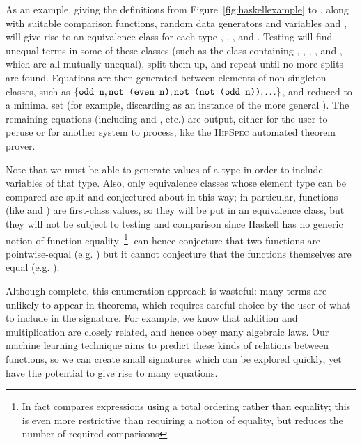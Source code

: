 As an example, giving the definitions from Figure~\ref{fig:haskellexample} to
\qspec{}, along with suitable comparison functions, random data generators and
variables  and , will give rise to an equivalence
class for each type , , ,  and
. Testing will find unequal terms in some of these classes
(such as the  class containing , , ,
,  and , which are all mutually unequal), split
them up, and repeat until no more splits are found. Equations are then generated
between elements of non-singleton classes, such as $\{\text{\texttt{odd n}},
\text{\texttt{not (even n)}}, \text{\texttt{not (not (odd n))}}, \ldots\}$, and reduced
to a minimal set (for example, discarding  as an
instance of the more general ). The remaining equations
(including  and , etc.) are
output, either for the user to peruse or for another system to process, like the
\textsc{HipSpec} automated theorem prover.

Note that we must be able to generate values of a type in order to include
variables of that type. Also, only equivalence classes whose element type can be
compared are split and conjectured about in this way; in particular, functions
(like  and ) are first-class values, so they will be put in an
equivalence class, but they will not be subject to testing and comparison since
Haskell has no generic notion of function equality~\footnote{In
  fact \qspec{} compares expressions using a total ordering rather than equality;
  this is even more restrictive than requiring a notion of equality, but reduces
  the number of required comparisons}. \qspec{} can hence conjecture that two
functions are pointwise-equal (e.g. ) but it cannot conjecture
that the functions themselves are equal (e.g. ).

Although complete, this enumeration approach is wasteful: many terms are
unlikely to appear in theorems, which requires careful choice by the user of
what to include in the signature. For example, we know that addition and
multiplication are closely related, and hence obey many algebraic laws. Our
machine learning technique aims to predict these kinds of relations between
functions, so we can create small signatures which can be explored quickly, yet
have the potential to give rise to many equations.

\iffalse TODO{2019-04-09} In fact, there are similarities between the way a TE
system like \qspec{} can generalise from checking \emph{particular} properties
to \emph{inventing} new ones, and the way counterexample finders like \qcheck{}
can generalise from testing \emph{particular} expressions to \emph{inventing}
expressions to test. One of our aims is to understand the implications of this
generalisation, the lessons that each can learn from the other's approach to
term generation, and the consequences for testing and QA in general.  \fi

